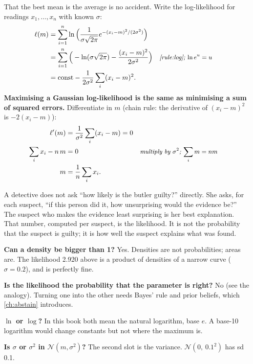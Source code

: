\documentclass[11pt,a4paper,oneside,openany]{book}
\newcommand{\why}[1]{&&\text{\small\itshape #1}}
\begin{document}
That the best mean is the average is no accident. Write the log-likelihood for readings $x_1,\dots,x_n$ with known $\sigma$:
\begin{align*}
\ell(m) &= \sum_{i=1}^{n}\ln\Big(\frac{1}{\sigma\sqrt{2\pi}}e^{-(x_i-m)^2/(2\sigma^2)}\Big)\\
 &= \sum_{i=1}^{n}\Big(-\ln(\sigma\sqrt{2\pi})-\frac{(x_i-m)^2}{2\sigma^2}\Big) \why{\cref{rule:log}; $\ln e^u=u$}\\
 &= \text{const}-\frac{1}{2\sigma^2}\sum_i(x_i-m)^2 .
\end{align*}
\textbf{Maximising a Gaussian log-likelihood is the same as minimising a sum of squared errors.} Differentiate in $m$ (chain rule:
the derivative of $(x_i-m)^2$ is $-2(x_i-m)$):
\begin{align*}
\ell'(m) &= \frac{1}{\sigma^2}\sum_i(x_i-m)=0\\
\sum_i x_i-n\,m &= 0 \why{multiply by $\sigma^2$; $\sum_i m=nm$}\\
m &= \frac1n\sum_ix_i .
\end{align*}

\begin{analogy}
A detective does not ask ``how likely is the butler guilty?'' directly. She asks, for each suspect, ``if this person did it, how
unsurprising would the evidence be?'' The suspect who makes the evidence least surprising is her best explanation. That number,
computed per suspect, is the likelihood. It is not the probability that the suspect is guilty; it is how well the suspect
explains what was found.
\end{analogy}

\begin{confusions}
\textbf{Can a density be bigger than 1?} Yes. Densities are not probabilities; areas are. The likelihood 2.920 above is a
product of densities of a narrow curve ($\sigma=0.2$), and is perfectly fine.

\textbf{Is the likelihood the probability that the parameter is right?} No (see the analogy). Turning one into the other needs
Bayes' rule and prior beliefs, which \cref{ch:abstain} introduces.

\textbf{$\ln$ or $\log$?} In this book both mean the natural logarithm, base $e$. A base-10 logarithm would change constants but
not where the maximum is.

\textbf{Is $\sigma$ or $\sigma^2$ in $\mathcal N(m,\sigma^2)$?} The second slot is the variance. $\mathcal N(0,\ 0.1^2)$ has sd
0.1.
\end{confusions}
\end{document}

